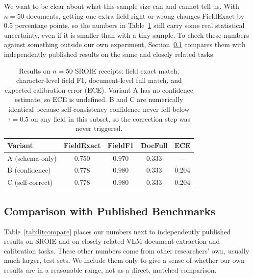 \documentclass[conference]{IEEEtran}
\begin{document}
We want to be clear about what this sample size can and cannot tell us. With \(n=50\) documents, getting one extra field right or wrong changes FieldExact by 0.5 percentage points, so the numbers in Table~\ref{tab:results} still carry some real statistical uncertainty, even if it is smaller than with a tiny sample. To check these numbers against something outside our own experiment, Section~\ref{sec:litcompare} compares them with independently published results on the same and closely related tasks.

\begin{table}[htb]
\centering
\caption{Results on \(n=50\) SROIE receipts: field exact match, character-level field F1, document-level full match, and expected calibration error (ECE). Variant A has no confidence estimate, so ECE is undefined. B and C are numerically identical because self-consistency confidence never fell below \(\tau=0.5\) on any field in this subset, so the correction step was never triggered.}
\label{tab:results}
\begin{tabular}{lcccc}
\hline
\textbf{Variant} & \textbf{FieldExact} & \textbf{FieldF1} & \textbf{DocFull} & \textbf{ECE}\\
\hline
A (schema-only) & 0.750 & 0.970 & 0.333 & ---\\
B (confidence) & 0.778 & 0.980 & 0.333 & 0.204\\
C (self-correct) & 0.778 & 0.980 & 0.333 & 0.204\\
\hline
\end{tabular}
\end{table}

\subsection{Comparison with Published Benchmarks}
\label{sec:litcompare}
Table~\ref{tab:litcompare} places our numbers next to independently published results on SROIE and on closely related VLM document-extraction and calibration tasks. These other numbers come from other researchers' own, usually much larger, test sets. We include them only to give a sense of whether our own results are in a reasonable range, not as a direct, matched comparison.
\end{document}
